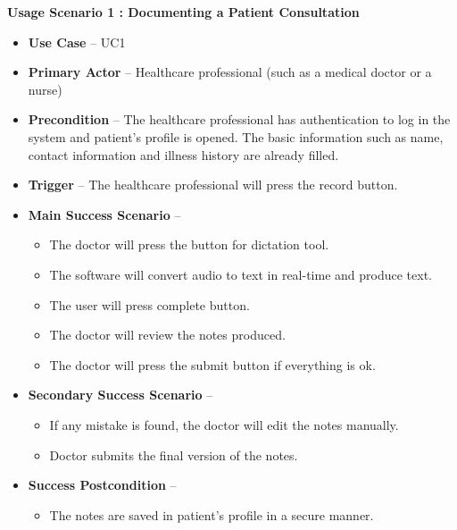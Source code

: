 \documentclass[12pt]{article}
\begin{document}
\textbf{Usage Scenario 1 : Documenting a Patient Consultation}

\begin{itemize}
  \item\textbf{Use Case} -- UC1
  \item\textbf{Primary Actor} -- Healthcare professional (such as a medical doctor or a nurse)
  \item\textbf{Precondition} -- The healthcare professional has authentication to log in the system and patient’s profile is opened. The basic information such as name, contact information and illness history are already filled.
  \item\textbf{Trigger} -- The healthcare professional will press the record button.
  \item\textbf{Main Success Scenario} --
  \begin{itemize}
    \item The doctor will press the button for dictation tool.
    \item The software will convert audio to text in real-time and produce text.
    \item The user will press complete button.
    \item  The doctor will review the notes produced.
    \item The doctor will press the submit button if everything is ok.
  \end{itemize}
  \item\textbf{Secondary Success Scenario} --
  \begin{itemize}
    \item If any mistake is found, the doctor will edit the notes manually.
    \item Doctor submits the final version of the notes.
  \end{itemize}
  \item\textbf{Success Postcondition} --
  \begin{itemize}
    \item The notes are saved in patient’s profile in a secure manner.
  \end{itemize}
\end{itemize}
\end{document}
